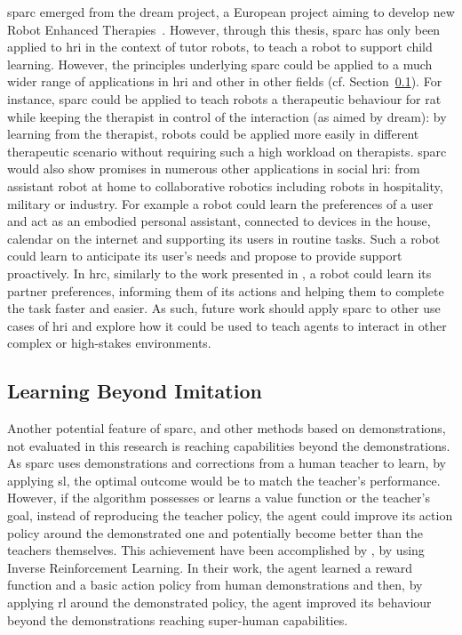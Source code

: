 \gls{sparc} emerged from the \acrshort{dream} project, a European project aiming to develop new Robot Enhanced Therapies~\citep{thill2012robot,esteban2017build}. However, through this thesis, \gls{sparc} has only been applied to \gls{hri} in the context of tutor robots, to teach a robot to support child learning. However, the principles underlying \gls{sparc} could be applied to a much wider range of applications in \gls{hri} and other in other fields (cf. Section~\ref{sec:disc_beyond}). For instance, \gls{sparc} could be applied to teach robots a therapeutic behaviour for \gls{rat} while keeping the therapist in control of the interaction (as aimed by \acrshort{dream}): by learning from the therapist, robots could be applied more easily in different therapeutic scenario without requiring such a high workload on therapists. \gls{sparc} would also show promises in numerous other applications in social \gls{hri}: from assistant robot at home to collaborative robotics including robots in hospitality, military or industry. For example a robot could learn the preferences of a user and act as an embodied personal assistant, connected to devices in the house, calendar on the internet and supporting its users in routine tasks. Such a robot could learn to anticipate its user's needs and propose to provide support proactively. In \gls{hrc}, similarly to the work presented in \cite{munzer2017efficient}, a robot could learn its partner preferences, informing them of its actions and helping them to complete the task faster and easier. As such, future work should apply \gls{sparc} to other use cases of \gls{hri} and explore how it could be used to teach agents to interact in other complex or high-stakes environments.


\subsection{Learning Beyond Imitation}\label{sec:disc_beyond}

Another potential feature of \gls{sparc}, and other methods based on demonstrations, not evaluated in this research is reaching capabilities beyond the demonstrations. As \gls{sparc} uses demonstrations and corrections from a human teacher to learn, by applying \gls{sl}, the optimal outcome would be to match the teacher's performance. However, if the algorithm possesses or learns a value function or the teacher's goal, instead of reproducing the teacher policy, the agent could improve its action policy around the demonstrated one and potentially become better than the teachers themselves. This achievement have been accomplished by \cite{abbeel2004apprenticeship}, by using Inverse Reinforcement Learning. In their work, the agent learned a reward function and a basic action policy from human demonstrations and then, by applying \gls{rl} around the demonstrated policy, the agent improved its behaviour beyond the demonstrations reaching super-human capabilities. 

